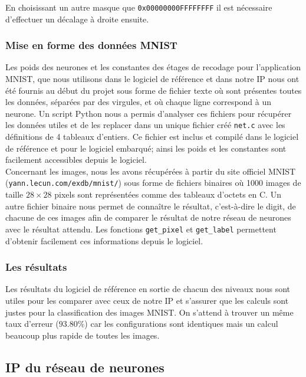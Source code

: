 En choisissant un autre masque que
\texttt{0x00000000FFFFFFFF}
il est nécessaire d'effectuer un décalage à droite ensuite.

\subsubsection{Mise en forme des données MNIST}

Les poids des neurones et les constantes des étages de recodage
pour l'application MNIST, que nous utilisons dans
le logiciel de référence et dans notre IP nous ont été fournis au début du projet
sous forme de fichier texte où sont présentes toutes les données, séparées par
des virgules, et où chaque ligne correspond à un neurone. Un script Python nous
a permis d'analyser ces fichiers pour récupérer les données utiles et de les
replacer dans un unique fichier créé \texttt{net.c} avec les définitions de
4 tableaux d'entiers. Ce fichier est inclus et compilé dans le logiciel de référence et
pour le logiciel embarqué; ainsi les poids et les constantes sont
facilement accessibles depuis le logiciel. \\
Concernant les images, nous les avons récupérées à partir du site
officiel MNIST \linebreak (\texttt{yann.lecun.com/exdb/mnist/}) sous forme de fichiers
binaires où 1000 images de taille $28 \times 28$ pixels sont représentées comme
des tableaux d'octets en C. Un autre fichier binaire nous permet de connaître
le résultat, c'est-à-dire le digit, de chacune de ces images afin de comparer le
résultat de notre réseau de neurones avec le résultat attendu.
Les fonctions \texttt{get\_pixel} et \texttt{get\_label} permettent d'obtenir
facilement ces informations depuis le logiciel.

\subsubsection{Les résultats}

Les résultats du logiciel de référence en sortie de chacun des niveaux nous
sont utiles pour les comparer avec ceux de notre IP et s'assurer que les calculs
sont justes pour la classification des images MNIST. On s'attend à trouver
un même taux d'erreur ($93.80\%$) car les configurations sont identiques
mais un calcul beaucoup plus rapide de toutes les images.



\subsection{IP du réseau de neurones}

